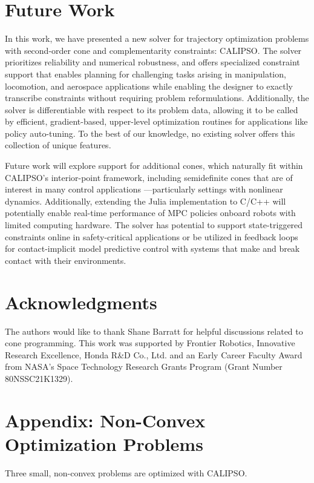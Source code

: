 \section{Future Work} \label{calipso_future_work}
In this work, we have presented a new solver for trajectory optimization problems with second-order cone and complementarity constraints: CALIPSO. The solver prioritizes reliability and numerical robustness, and offers specialized constraint support that enables planning for challenging tasks arising in manipulation, locomotion, and aerospace applications while enabling the designer to exactly transcribe constraints without requiring problem reformulations. Additionally, the solver is differentiable with respect to its problem data, allowing it to be called by efficient, gradient-based, upper-level optimization routines for applications like policy auto-tuning. To the best of our knowledge, no existing solver offers this collection of unique features.

Future work will explore support for additional cones, which naturally fit within CALIPSO's interior-point framework, including semidefinite cones that are of interest in many control applications \cite{palan2020fitting}---particularly settings with nonlinear dynamics. Additionally, extending the Julia implementation to C/C++ will potentially enable real-time performance of MPC policies onboard robots with limited computing hardware. The solver has potential to support state-triggered constraints online in safety-critical applications or be utilized in feedback loops for contact-implicit model predictive control \cite{lecleach2021fast} with systems that make and break contact with their environments.

\section*{Acknowledgments}
The authors would like to thank Shane Barratt for helpful discussions related to cone programming. 
This work was supported by Frontier Robotics, Innovative Research Excellence, Honda R\&D Co., Ltd.
and an Early Career Faculty Award from NASA’s Space Technology Research Grants Program (Grant Number 80NSSC21K1329).

\section{Appendix: Non-Convex Optimization Problems} \label{calipso_nonconvex_benchmarks}
Three small, non-convex problems are optimized with CALIPSO. 

